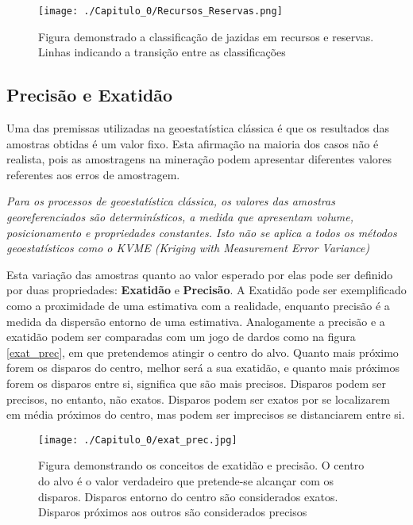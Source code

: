 \FloatBarrier
\begin{figure}[!htb]
	\centering
	\texttt{[image: ./Capitulo\_0/Recursos\_Reservas.png]}	
	\caption{Figura demonstrado a classificação de jazidas em recursos e reservas. Linhas indicando a transição entre as classificações }
	\label{Recursos_Reservas}
\end{figure}
\FloatBarrier


\subsection{Precisão e Exatidão}


Uma das premissas utilizadas na geoestatística clássica é que os resultados das amostras obtidas é um valor fixo. Esta afirmação na maioria dos casos não é realista, pois as amostragens na mineração podem apresentar diferentes valores referentes aos erros de amostragem. 

\begin{proposition}
	\textit{Para os processos de geoestatística clássica, os valores das amostras georeferenciados são determinísticos, a medida que apresentam volume, posicionamento e propriedades constantes. Isto não se aplica a todos os métodos geoestatísticos como o KVME (Kriging with Measurement Error Variance) \cite{delhomme1978applications}}
\end{proposition}


Esta variação das amostras quanto ao valor esperado por elas pode ser definido por duas propriedades: \textbf{Exatidão} e \textbf{Precisão}.  A Exatidão pode ser exemplificado como a proximidade de uma estimativa com a realidade, enquanto precisão é a medida da dispersão entorno de uma estimativa. Analogamente a precisão e a exatidão podem ser comparadas com um jogo de dardos como na figura \eqref{exat_prec}, em que pretendemos atingir o centro do alvo. Quanto mais próximo forem os disparos do centro, melhor será a sua exatidão, e quanto mais próximos forem os disparos entre si, significa que são mais precisos. Disparos podem ser precisos, no entanto, não exatos. Disparos podem ser exatos por se localizarem em média próximos do centro, mas podem ser imprecisos se distanciarem entre si. 

\FloatBarrier
\begin{figure}[!htb]
	\centering
	\texttt{[image: ./Capitulo\_0/exat\_prec.jpg]}	
	\caption{Figura demonstrando os conceitos de exatidão e precisão. O centro do alvo é o valor verdadeiro que pretende-se alcançar com os disparos. Disparos entorno do centro são considerados exatos. Disparos próximos aos outros são considerados precisos }
	\label{exat_prec}
\end{figure}
\FloatBarrier

